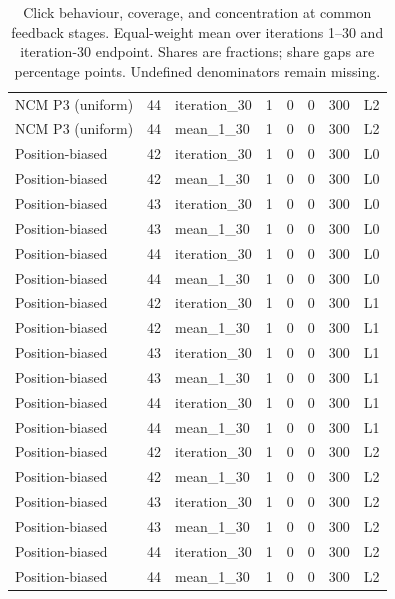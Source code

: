 \begin{table}[htbp!]
\begin{tabular}{lrlrrrrl}
NCM P3 (uniform) & 44 & iteration\_30 & 1 & 0 & 0 & 300 & L2 \\
NCM P3 (uniform) & 44 & mean\_1\_30 & 1 & 0 & 0 & 300 & L2 \\
Position-biased & 42 & iteration\_30 & 1 & 0 & 0 & 300 & L0 \\
Position-biased & 42 & mean\_1\_30 & 1 & 0 & 0 & 300 & L0 \\
Position-biased & 43 & iteration\_30 & 1 & 0 & 0 & 300 & L0 \\
Position-biased & 43 & mean\_1\_30 & 1 & 0 & 0 & 300 & L0 \\
Position-biased & 44 & iteration\_30 & 1 & 0 & 0 & 300 & L0 \\
Position-biased & 44 & mean\_1\_30 & 1 & 0 & 0 & 300 & L0 \\
Position-biased & 42 & iteration\_30 & 1 & 0 & 0 & 300 & L1 \\
Position-biased & 42 & mean\_1\_30 & 1 & 0 & 0 & 300 & L1 \\
Position-biased & 43 & iteration\_30 & 1 & 0 & 0 & 300 & L1 \\
Position-biased & 43 & mean\_1\_30 & 1 & 0 & 0 & 300 & L1 \\
Position-biased & 44 & iteration\_30 & 1 & 0 & 0 & 300 & L1 \\
Position-biased & 44 & mean\_1\_30 & 1 & 0 & 0 & 300 & L1 \\
Position-biased & 42 & iteration\_30 & 1 & 0 & 0 & 300 & L2 \\
Position-biased & 42 & mean\_1\_30 & 1 & 0 & 0 & 300 & L2 \\
Position-biased & 43 & iteration\_30 & 1 & 0 & 0 & 300 & L2 \\
Position-biased & 43 & mean\_1\_30 & 1 & 0 & 0 & 300 & L2 \\
Position-biased & 44 & iteration\_30 & 1 & 0 & 0 & 300 & L2 \\
Position-biased & 44 & mean\_1\_30 & 1 & 0 & 0 & 300 & L2 \\
\hline
\end{tabular}
\caption{Click behaviour, coverage, and concentration at common feedback stages. Equal-weight mean over iterations 1--30 and iteration-30 endpoint. Shares are fractions; share gaps are percentage points. Undefined denominators remain missing.}
\label{chap:results:tab:rq2_models_click_behaviour}
\end{table}
